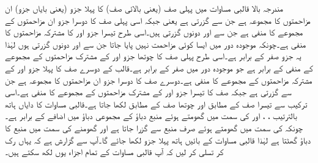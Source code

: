 مندرجہ بالا قالبی مساوات میں پہلی صف  (یعنی بالائی صف) کا پہلا جزو (یعنی بایاں جزو) ان مزاحمتوں کا مجموعہ ہے جن سے  گزرتی ہے یعنی  جبکہ اسی پہلی صف کا دوسرا جزو ان مزاحمتوں کے مجموعے کا منفی ہے جن سے  اور  دونوں گزرتی ہیں۔اسی طرح تیسرا جزو  اور  کا مشترکہ مزاحمتوں کا منفی ہے۔چونکہ موجودہ دور میں ایسا کوئی مزاحمت نہیں پایا جاتا جن سے  اور  دونوں گزرتی ہوں لہٰذا یہ جزو صفر کے برابر ہے۔اسی طرح پہلی صف کا چوتھا  جزو  اور  کے مشترک مزاحمتوں کے مجموعے کے منفی کے برابر ہے جو موجودہ دور میں صفر کے برابر ہے۔قالب کے دوسرے صف کا پہلا جزو  اور  کے مشترکہ مزاحمتوں کے مجموعے کا منفی ہے۔دوسرے صف کا دوسرا جزو ان مزاحمتوں کا مجموعہ ہے جن سے  گزرتی ہے جبکہ صف کا تیسرا جزو  اور  کے مشترک مزاحمتوں کے مجموعے کا منفی ہے۔اسی ترکیب سے تیسرا صف  کے مطابق اور چوتھا صف  کے مطابق لکھا جاتا ہے۔قالبی مساوات کا دایاں ہاتھ بالترتیب ، ،  اور  کی سمت میں گھومتے ہوئے منبع دباؤ کے مجموعی دباؤ میں اضافے کے برابر ہے۔چونکہ  کی سمت میں گھومتے ہوئے صرف منبع  سے گزرا جاتا ہے اور گھومنے کی سمت میں منبع کا دباؤ گھٹتا ہے لہٰذا قالبی مساوات کے بائیں ہاتھ پہلا جزو  لکھا جائے گا۔آپ سے گزارش ہے کہ یہاں رک کر تسلی کر لیں کہ آپ قالبی مساوات کے تمام اجزاء یوں لکھ سکتے ہیں۔ 

